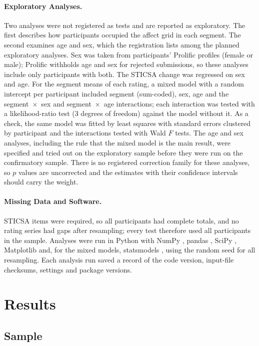 \documentclass[man,floatsintext,12pt,donotrepeattitle]{apa7}
\begin{document}
\paragraph{Exploratory Analyses.} Two analyses were not registered as tests and are reported as exploratory. The
first describes how participants occupied the affect grid in each segment. The second examines age and sex, which the
registration lists among the planned exploratory analyses. Sex was taken from participants' Prolific profiles (female
or male); Prolific withholds age and sex for rejected submissions, so these analyses include only participants with
both. The STICSA change was regressed on sex and age. For the segment means of each rating, a mixed model with a random
intercept per participant included segment (sum-coded), sex, age and the segment~$\times$~sex and segment~$\times$~age
interactions; each interaction was tested with a likelihood-ratio test (3 degrees of freedom) against the model
without it. As a check, the same model was fitted by least squares with standard errors clustered by participant and
the interactions tested with Wald $F$ tests. The age and sex analyses, including the rule that the mixed model is
the main result, were specified and tried out on the exploratory sample before they were run on the confirmatory
sample. There is no registered correction family for these
analyses, so $p$ values are uncorrected and the estimates with their confidence intervals should carry the weight.

\paragraph{Missing Data and Software.} STICSA items were required, so all participants had complete totals, and no
rating series had gaps after resampling; every test therefore used all participants in the sample. Analyses were run
in Python  with NumPy , pandas , SciPy
, Matplotlib  and, for the mixed models, statsmodels
, using the random seed  for all resampling.
Each analysis run saved a record of the code version, input-file checksums, settings and package versions.

\section{Results}

\subsection{Sample}
\end{document}
